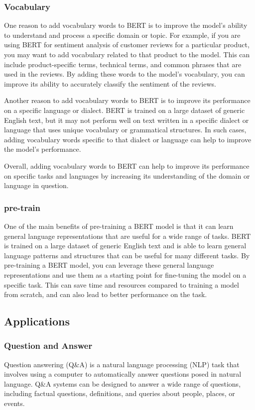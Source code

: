 \subsubsection{Vocabulary} One reason to add vocabulary words to BERT is to improve the model's ability to understand and process a specific domain or topic. For example, if you are using BERT for sentiment analysis of customer reviews for a particular product, you may want to add vocabulary related to that product to the model. This can include product-specific terms, technical terms, and common phrases that are used in the reviews. By adding these words to the model's vocabulary, you can improve its ability to accurately classify the sentiment of the reviews.

Another reason to add vocabulary words to BERT is to improve its performance on a specific language or dialect. BERT is trained on a large dataset of generic English text, but it may not perform well on text written in a specific dialect or language that uses unique vocabulary or grammatical structures. In such cases, adding vocabulary words specific to that dialect or language can help to improve the model's performance.

Overall, adding vocabulary words to BERT can help to improve its performance on specific tasks and languages by increasing its understanding of the domain or language in question.

\subsubsection{pre-train} One of the main benefits of pre-training a BERT model is that it can learn general language representations that are useful for a wide range of tasks. BERT is trained on a large dataset of generic English text and is able to learn general language patterns and structures that can be useful for many different tasks. By pre-training a BERT model, you can leverage these general language representations and use them as a starting point for fine-tuning the model on a specific task. This can save time and resources compared to training a model from scratch, and can also lead to better performance on the task.

\subsection{Applications}

\subsubsection{Question and Answer} Question answering (Q&A) is a natural language processing (NLP) task that involves using a computer to automatically answer questions posed in natural language. Q&A systems can be designed to answer a wide range of questions, including factual questions, definitions, and queries about people, places, or events.

